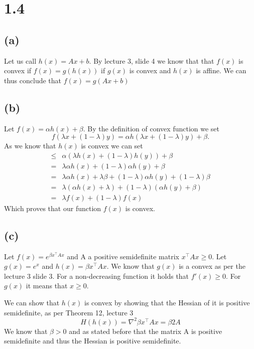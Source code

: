 \documentclass{article}
\begin{document}
\section*{1.4}
	\subsection*{(a)}
	Let us call $h(x) = Ax + b$.
	By lecture 3, slide 4 we know that that $f(x)$ is convex if $f(x) = g(h(x))$ if $g(x)$ is convex and $h(x)$ is affine. We can thus conclude that $f(x) = g(Ax+b)$
	\subsection*{(b)}
	Let $f(x)=\alpha h(x) + \beta$.
	By the definition of convex function we set
	\begin{equation}
		f(\lambda x + (1-\lambda) y ) =
		\alpha h(\lambda x + (1-\lambda) y ) + \beta.
	\end{equation}
	As we know that $h(x)$ is convex we can set
	\begin{align}
		\leq& \alpha (\lambda h(x) + (1-\lambda) h(y) ) + \beta \\
		= &\lambda \alpha h(x) + (1-\lambda)\alpha h(y) + \beta \\
		= & \lambda \alpha h(x) + \lambda\beta + (1-\lambda)\alpha h(y) + (1-\lambda)\beta \\
		=& \lambda (\alpha h(x) + \lambda) + (1-\lambda)(\alpha h(y) + \beta) \\
		=& \lambda f(x) + (1-\lambda)f(x)
	\end{align}
	Which proves that our function $f(x)$ is convex.
	\subsection*{(c)}
	Let $f(x) = e^{\beta x^\top A x}$ and A a positive semidefinite matrix $x^\top A x \geq 0$. Let $g(x)=e^x$ and $h(x)=\beta x^\top A x$. We know that $g(x)$ is a convex as per the lecture 3 slide 3. For a non-decreasing function it holds that $f'(x)\geq 0$. For $g(x)$ it means that $x\geq 0$.
	
	We can show that $h(x)$ is convex by showing that the Hessian of it is positive semidefinite, as per Theorem 12, lecture 3
	\begin{equation}
		H(h(x)) = \nabla^2 \beta x^\top A x = \beta 2 A
	\end{equation}
	We know that $\beta > 0$ and as stated before that the matrix A is positive semidefinite and thus the Hessian is positive semidefinite.
	
\end{document}
